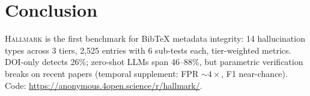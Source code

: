 \section{Conclusion}
\label{sec:conclusion}

\textsc{Hallmark} is the first benchmark for BibTeX metadata integrity: 14 hallucination types across 3 tiers, 2,525 entries with 6 sub-tests each, tier-weighted metrics. DOI-only detects 26\%; zero-shot LLMs span 46--88\%, but parametric verification breaks on recent papers (temporal supplement: FPR ${\sim}4{\times}$, F1 near-chance). Code: \url{https://anonymous.4open.science/r/hallmark/}.
